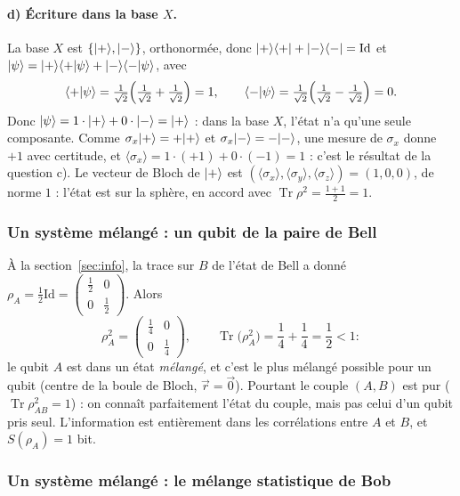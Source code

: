 \paragraph{d) Écriture dans la base $X$.} La base $X$ est $\{|+\rangle,|-\rangle\}$, orthonormée, donc
$|+\rangle\langle +|+|-\rangle\langle -|=\mathrm{Id}$ et
$|\psi\rangle=|+\rangle\langle +|\psi\rangle+|-\rangle\langle -|\psi\rangle$, avec
\[
  \langle +|\psi\rangle=\tfrac{1}{\sqrt2}\Big(\tfrac{1}{\sqrt2}+\tfrac{1}{\sqrt2}\Big)=1,
  \qquad
  \langle -|\psi\rangle=\tfrac{1}{\sqrt2}\Big(\tfrac{1}{\sqrt2}-\tfrac{1}{\sqrt2}\Big)=0 .
\]
Donc $|\psi\rangle=1\cdot|+\rangle+0\cdot|-\rangle=|+\rangle$ : dans la base $X$, l'état n'a qu'une
seule composante. Comme $\sigma_x|+\rangle=+|+\rangle$ et $\sigma_x|-\rangle=-|-\rangle$, une
mesure de $\sigma_x$ donne $+1$ avec certitude, et
$\langle\sigma_x\rangle=1\cdot(+1)+0\cdot(-1)=1$ : c'est le résultat de la question c).
Le vecteur de Bloch de $|+\rangle$ est $(\langle\sigma_x\rangle,\langle\sigma_y\rangle,\langle\sigma_z\rangle)=(1,0,0)$,
de norme $1$ : l'état est sur la sphère, en accord avec $\operatorname{Tr}\rho^2=\frac{1+1}{2}=1$.

\subsubsection{Un système mélangé : un qubit de la paire de Bell}

À la section~\ref{sec:info}, la trace sur $B$ de l'état de Bell a donné
$\rho_A=\frac12\mathrm{Id}=\begin{pmatrix}\frac12&0\\0&\frac12\end{pmatrix}$. Alors
\[
  \rho_A^2=\begin{pmatrix}\frac14&0\\0&\frac14\end{pmatrix},
  \qquad
  \operatorname{Tr}\big(\rho_A^2\big)=\frac14+\frac14=\frac12<1 :
\]
le qubit $A$ est dans un état \emph{mélangé}, et c'est le plus mélangé possible pour un qubit
(centre de la boule de Bloch, $\vec r=\vec0$). Pourtant le couple $(A,B)$ est pur
($\operatorname{Tr}\rho_{AB}^2=1$) : on connaît parfaitement l'état du couple, mais pas celui d'un
qubit pris seul. L'information est entièrement dans les corrélations entre $A$ et $B$, et
$S(\rho_A)=1$ bit.

\subsubsection{Un système mélangé : le mélange statistique de Bob}

